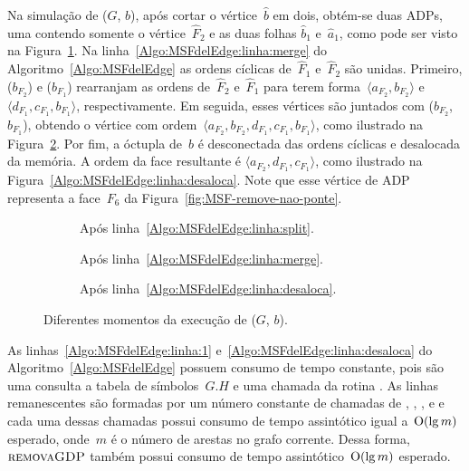 Na simulação de \MSFdelEdge($G$, $b$), após cortar o vértice~$\hat b$ em dois, obtém-se duas ADPs, uma contendo somente o vértice~$\hat F_2$ e as duas folhas $\hat b_1$ e~$\hat a_1$, como pode ser visto na Figura~\ref{fig:MSF-remove-aresta-ex-1}.
Na linha~\ref{Algo:MSFdelEdge:linha:merge} do Algoritmo~\ref{Algo:MSFdelEdge} as ordens cíclicas de~$\hat F_1$ e~$\hat F_2$ são unidas.
Primeiro, \LCOCycle($b_{F_2}$) e \LCOCycle($b_{F_1}$) rearranjam as ordens de~$\hat F_2$ e~$\hat F_1$ para terem forma~$\langle  a_{F_2}, b_{F_2} \rangle$ e~$\langle d_{F_1}, c_{F_1}, b_{F_1}\rangle$, respectivamente.
Em seguida, esses vértices são juntados com \LCOMerge($b_{F_2}$, $b_{F_1}$), obtendo o vértice com ordem~$\langle a_{F_2}, b_{F_2}, d_{F_1}, c_{F_1}, b_{F_1}\rangle$, como ilustrado na Figura~\ref{fig:MSF-remove-aresta-ex-2}.
Por fim, a óctupla de~$b$ é desconectada das ordens cíclicas e desalocada da memória.
A ordem da face resultante é $\langle a_{F_2}, d_{F_1}, c_{F_1}\rangle$, como ilustrado na Figura~\ref{Algo:MSFdelEdge:linha:desaloca}.
Note que esse vértice de ADP representa a face~$F_6$ da Figura~\ref{fig:MSF-remove-nao-ponte}. 

\begin{figure}[h!]
\begin{subfigure}{.2\textwidth}

\caption{Após linha~\ref{Algo:MSFdelEdge:linha:split}.}
\label{fig:MSF-remove-aresta-ex-1}
\end{subfigure}
\hfill
\begin{subfigure}{.2\textwidth}

\caption{Após linha~\ref{Algo:MSFdelEdge:linha:merge}.}
\label{fig:MSF-remove-aresta-ex-2}
\end{subfigure}
\hfill
\begin{subfigure}{.2\textwidth}

\caption{Após linha~\ref{Algo:MSFdelEdge:linha:desaloca}.}
\label{fig:MSF-remove-aresta-ex-3}
\end{subfigure}
\caption{Diferentes momentos da execução de \MSFdelEdge($G$, $b$).}
\label{fig:MSF-remocao-b}
\end{figure}


As linhas~\ref{Algo:MSFdelEdge:linha:1} e~\ref{Algo:MSFdelEdge:linha:desaloca} do Algoritmo~\ref{Algo:MSFdelEdge} possuem consumo de tempo constante, pois são uma consulta a tabela de símbolos~$G.H$ e uma chamada da rotina \LCODestroyOcto{}.
As linhas remanescentes são formadas por um número constante de chamadas de \LCOFindNode, \LCOCycle{}, \LCOMerge{}, \LCOSplit{} e \MSFupdate{} e cada uma dessas chamadas possui consumo de tempo assintótico igual a~$\mathrm{O}(\lg m)$ esperado, onde~$m$ é o número de arestas no grafo corrente.
Dessa forma, $\text{\scshape removaGDP}$ também possui consumo de tempo assintótico~$\mathrm{O}(\lg m)$ esperado.


